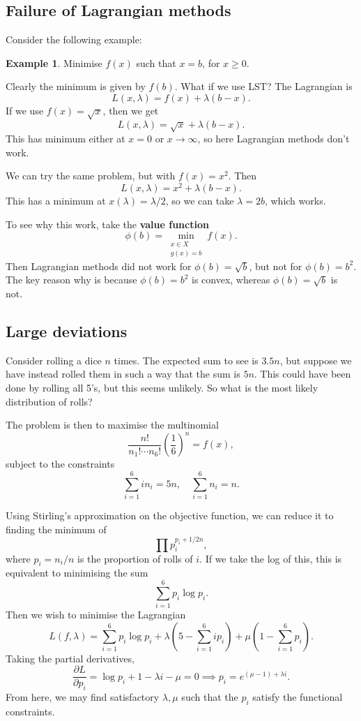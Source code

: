 \documentclass[12pt]{article}
\theoremstyle{definition}
\newtheorem{example}{Example}[section]
\theoremstyle{remark}
\begin{document}
\subsection{Failure of Lagrangian methods}%
\label{sub:failure_of_lagrangian_methods}

Consider the following example:

\begin{example}
	Minimise $f(x)$ such that $x = b$, for $x \geq 0$.
\end{example}
Clearly the minimum is given by $f(b)$. What if we use LST? The Lagrangian is
\[
	L(x, \lambda) = f(x) + \lambda(b - x)
.\]
If we use $f(x) = \sqrt{x}$, then we get
\[
	L(x, \lambda) = \sqrt{x} + \lambda(b - x)
.\]
This has minimum either at $x = 0$ or $x \to \infty$, so here Lagrangian methods don't work.

We can try the same problem, but with $f(x) = x^2$. Then
\[
	L(x, \lambda) = x^2 + \lambda(b - x)
.\]
This has a minimum at $x(\lambda) = \lambda/2$, so we can take $\lambda = 2b$, which works.

To see why this work, take the \textbf{value function}
\[
	\phi(b) = \min_{\substack{x \in X \\ g(x) = b}} f(x)
.\]
Then Lagrangian methods did not work for $\phi(b) = \sqrt{b}$, but not for $\phi(b) = b^2$. The key reason why is because $\phi(b) = b^2$ is convex, whereas $\phi(b) = \sqrt{b}$ is not.

\subsection{Large deviations}%
\label{sub:large_deviations}

Consider rolling a dice $n$ times. The expected sum to see is $3.5n$, but suppose we have instead rolled them in such a way that the sum is $5n$. This could have been done by rolling all 5's, but this seems unlikely. So what is the most likely distribution of rolls?

The problem is then to maximise the multinomial
\[
	\frac{n!}{n_1! \cdots n_6!} \left( \frac{1}{6} \right)^{n} = f(x)
,\] 
subject to the constraints
\[
\sum_{i = 1}^{6} i n_i = 5n, \quad \sum_{i = 1}^{6} n_i = n
.\]

Using Stirling's approximation on the objective function, we can reduce it to finding the minimum of
\[
\prod p_i^{p_i + 1/2n}
,\]
where $p_i = n_i/n$ is the proportion of rolls of $i$. If we take the log of this, this is equivalent to minimising the sum
\[
\sum_{i = 1}^{6} p_i \log p_i
.\]
Then we wish to minimise the Lagrangian
\[
	L(f, \lambda) = \sum_{i = 1}^{6} p_i \log p_i + \lambda\left(5 - \sum_{i = 1}^{6} i p_i \right) + \mu \left( 1 - \sum_{i = 1}^{6} p_i \right)
.\]
Taking the partial derivatives,
\[
	\frac{\partial L}{\partial p_i} = \log p_i + 1 - \lambda i - \mu = 0 \implies p_i = e^{(\mu - 1) + \lambda i}
.\]
From here, we may find satisfactory $\lambda, \mu$ such that the $p_i$ satisfy the functional constraints.
\end{document}
